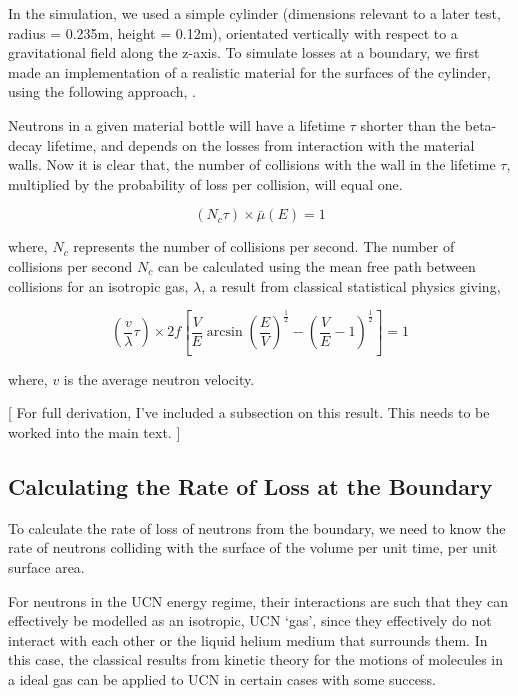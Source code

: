 \documentclass[11pt,a4paper,oneside]{article}
\begin{document}
In the simulation, we used a simple cylinder (dimensions relevant to a later test, radius = 0.235m, height = 0.12m), orientated vertically with respect to a gravitational field along the z-axis. To simulate losses at a boundary, we first made an implementation of a realistic material for the surfaces of the cylinder, using the following approach, \cite{Pe.09}.

Neutrons in a given material bottle will have a lifetime $\tau$ shorter than the beta-decay lifetime, and depends on the losses from interaction with the material walls. Now it is clear that, the number of collisions with the wall in the lifetime $\tau$, multiplied by the probability of loss per collision, will equal one. 

\begin{equation}
(N_{c} \tau) \times \bar{\mu}(E) = 1
\label{eqn:collisionsintau}
\end{equation}

where, $N_{c}$ represents the number of collisions per second. The number of collisions per second $N_{c}$ can be calculated using the mean free path between collisions for an isotropic gas, $\lambda$, a result from classical statistical physics giving,

\begin{equation}
(\frac{v}{\lambda} \tau) \times 2f \left[ \frac{V}{E} \arcsin \left( \frac{E}{V} \right) ^{\frac{1}{2}} - \left(\frac{V}{E} - 1 \right)^{\frac{1}{2}} \right] = 1
\label{eqn:meanfreepathcollisionsintau}
\end{equation}

where, $v$ is the average neutron velocity. 

[ For full derivation, I've included a subsection on this result. This needs to be worked into the main text. ]

\subsection*{Calculating the Rate of Loss at the Boundary}

To calculate the rate of loss of neutrons from the boundary, we need to know the rate of neutrons colliding with the surface of the volume per unit time, per unit surface area. 

For neutrons in the UCN energy regime, their interactions are such that they can effectively be modelled as an isotropic, UCN `gas', since they effectively do not interact with each other or the liquid helium medium that surrounds them. In this case, the classical results from kinetic theory for the motions of molecules in a ideal gas can be applied to UCN in certain cases with some success. 
\end{document}
